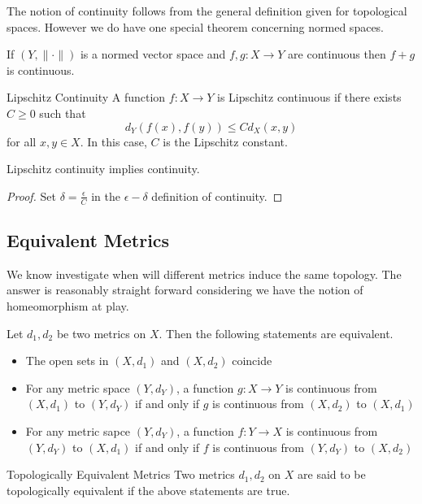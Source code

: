 \documentclass[a4paper]{article}
\begin{document}
The notion of continuity follows from the general definition given for topological spaces. However we do have one special theorem concerning normed spaces. 

\begin{prp}{}{} If $(Y,\|\cdot\|)$ is a normed vector space and $f,g:X\to Y$ are continuous then $f+g$ is continuous. 
\end{prp}

\begin{defn}{Lipschitz Continuity}{} A function $f:X\to Y$ is Lipschitz continuous if there exists $C\geq 0$ such that $$d_Y(f(x),f(y))\leq Cd_X(x,y)$$ for all $x,y\in X$. In this case, $C$ is the Lipschitz constant. 
\end{defn}

\begin{lmm}{}{} Lipschitz continuity implies continuity. \tcbline
\begin{proof}
Set $\delta=\frac{\epsilon}{C}$ in the $\epsilon-\delta$ definition of continuity. 
\end{proof}
\end{lmm}

\subsection{Equivalent Metrics}
We know investigate when will different metrics induce the same topology. The answer is reasonably straight forward considering we have the notion of homeomorphism at play. 

\begin{thm}{}{} Let $d_1,d_2$ be two metrics on $X$. Then the following statements are equivalent. 
\begin{itemize}
\item The open sets in $(X,d_1)$ and $(X,d_2)$ coincide
\item For any metric space $(Y,d_Y)$, a function $g:X\to Y$ is continuous from $(X,d_1)$ to $(Y,d_Y)$ if and only if $g$ is continuous from $(X,d_2)$ to $(X,d_1)$
\item For any metric sapce $(Y,d_Y)$, a function $f:Y\to X$ is continuous from $(Y,d_Y)$ to $(X,d_1)$ if and only if $f$ is continuous from $(Y,d_Y)$ to $(X,d_2)$
\end{itemize}
\end{thm}

\begin{defn}{Topologically Equivalent Metrics}{} Two metrics $d_1,d_2$ on $X$ are said to be topologically equivalent if the above statements are true. 
\end{defn}
\end{document}
